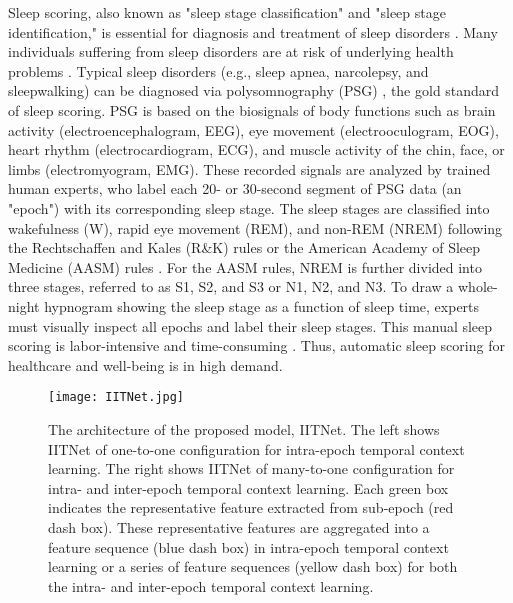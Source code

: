 \documentclass[10pt,twocolumn,twoside]{IEEEtran}
\begin{document}
    Sleep scoring, also known as "sleep stage classification" and "sleep stage identification," is essential for diagnosis and treatment of sleep disorders \cite{wulff2010sleep}. Many individuals suffering from sleep disorders are at risk of underlying health problems \cite{torabi2015withstanding}. Typical sleep disorders (e.g., sleep apnea, narcolepsy, and sleepwalking) can be diagnosed via polysomnography (PSG) \cite{berthomier2007automatic}, the gold standard of sleep scoring. PSG is based on the biosignals of body functions such as brain activity (electroencephalogram, EEG), eye movement (electrooculogram, EOG), heart rhythm (electrocardiogram, ECG), and muscle activity of the chin, face, or limbs (electromyogram, EMG). These recorded signals are analyzed by trained human experts, who label each 20- or 30-second segment of PSG data (an "epoch") with its corresponding sleep stage. The sleep stages are classified into wakefulness (W), rapid eye movement (REM), and non-REM (NREM) following the Rechtschaffen and Kales (R\&K) rules \cite{ALLANHOBSON1969644,rechtschaffen1968manual} or the American Academy of Sleep Medicine (AASM) rules \cite{berry2012aasm}. For the AASM rules, NREM is further divided into three stages, referred to as S1, S2, and S3 or N1, N2, and N3. To draw a whole-night hypnogram showing the sleep stage as a function of sleep time, experts must visually inspect all epochs and label their sleep stages. This manual sleep scoring is labor-intensive and time-consuming \cite{stephansen2017use,stepnowsky2013scoring,rosenberg2013american}. Thus, automatic sleep scoring for healthcare and well-being  is in high demand.
    
    \begin{figure*}[ht]
        \centering
      \texttt{[image: IITNet.jpg]}
      \caption{The architecture of the proposed model, IITNet. The left shows IITNet of one-to-one configuration for intra-epoch temporal context learning. The right shows IITNet of many-to-one configuration for intra- and inter-epoch temporal context learning. Each green box indicates the representative feature extracted from sub-epoch (red dash box). These representative features are aggregated into a feature sequence (blue dash box) in intra-epoch temporal context learning or a series of feature sequences (yellow dash box) for both the intra- and inter-epoch temporal context learning.}  
      \label{fig:ModelArchitecture}
    \end{figure*}
    
\end{document}
